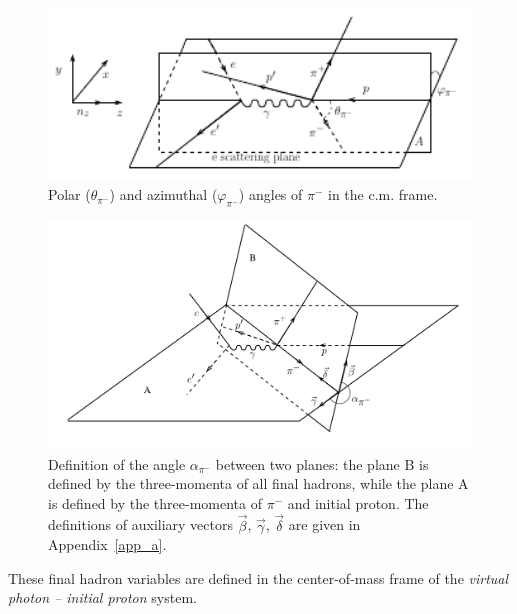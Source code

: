 \begin{figure}[htp]
\begin{center}
\includegraphics[width=12cm]{pictures/2pi_elprod/thetaphi.pdf}
\caption{\small Polar ($\theta_{\pi^{-}}$) and azimuthal ($\varphi_{\pi^{-}}$) angles of $\pi^{-}$ in the c.m. frame.} \label{fig:cr_sec_thetaphi}
\end{center}
\end{figure}


\begin{figure}[htp]
\begin{center}
\includegraphics[width=12cm]{pictures/2pi_elprod/alpha1.pdf}
\caption{\small Definition of the angle $\alpha_{\pi^{-}}$ between two planes: the plane B is defined by the three-momenta of all final hadrons, while the plane A is defined by  the three-momenta of $\pi^{-}$ and initial proton. The definitions of  auxiliary vectors $\vec \beta$, $\vec \gamma$, $\vec \delta$ are given in Appendix~\ref{app_a}.} \label{fig:alpha_2nd_set}
\end{center}
\end{figure}



These final hadron variables are defined in the center-of-mass frame of the \textit{virtual photon -- initial proton} system. 





